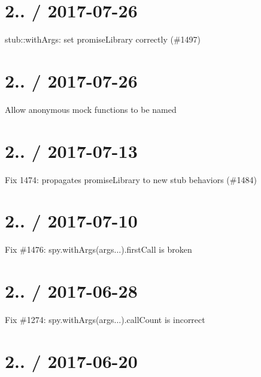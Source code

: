 \section*{2.. / 2017-\/07-\/26 }


\begin{DoxyItemize}
\item stub\+::with\+Args\+: set promise\+Library correctly (\#1497)
\end{DoxyItemize}

\section*{2.. / 2017-\/07-\/26 }


\begin{DoxyItemize}
\item Allow anonymous mock functions to be named
\end{DoxyItemize}

\section*{2.. / 2017-\/07-\/13 }


\begin{DoxyItemize}
\item Fix 1474\+: propagates promise\+Library to new stub behaviors (\#1484)
\end{DoxyItemize}

\section*{2.. / 2017-\/07-\/10 }


\begin{DoxyItemize}
\item Fix \#1476\+: spy.\+with\+Args(args...).first\+Call is broken
\end{DoxyItemize}

\section*{2.. / 2017-\/06-\/28 }


\begin{DoxyItemize}
\item Fix \#1274\+: spy.\+with\+Args(args...).call\+Count is incorrect
\end{DoxyItemize}

\section*{2.. / 2017-\/06-\/20 }


